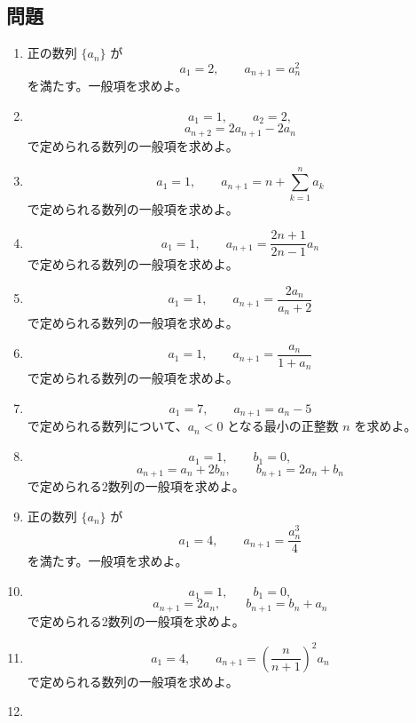     \subsection{問題}\label{節：基本と応用から出題されるもの：問題}
      \begin{enumerate}[label=\textbf{問\arabic*.},leftmargin=3.8em,format=\bookitemlink{practice-basic}{problem}{answer}]
        \item 正の数列 \(\{a_n\}\) が
          \[
            a_1=2,\qquad a_{n+1}=a_n^2
          \]
              を満たす。一般項を求めよ。
        \item \[
            a_1=1,\qquad a_2=2,
          \]
          \[
            a_{n+2}=2a_{n+1}-2a_n
          \]
              で定められる数列の一般項を求めよ。
        \item \[
            a_1=1,\qquad
            a_{n+1}=n+\sum_{k=1}^{n}a_k
          \]
              で定められる数列の一般項を求めよ。
        \item \[
            a_1=1,\qquad
            a_{n+1}=\frac{2n+1}{2n-1}a_n
          \]
              で定められる数列の一般項を求めよ。
        \item \[
            a_1=1,\qquad
            a_{n+1}=\frac{2a_n}{a_n+2}
          \]
              で定められる数列の一般項を求めよ。
        \item \[
            a_1=1,\qquad
            a_{n+1}=\frac{a_n}{1+a_n}
          \]
              で定められる数列の一般項を求めよ。
        \item \[
            a_1=7,\qquad a_{n+1}=a_n-5
          \]
              で定められる数列について、\(a_n<0\) となる最小の正整数 \(n\) を求めよ。
        \item \[
            a_1=1,\qquad b_1=0,
          \]
          \[
            a_{n+1}=a_n+2b_n,\qquad
            b_{n+1}=2a_n+b_n
          \]
              で定められる2数列の一般項を求めよ。
        \item 正の数列 \(\{a_n\}\) が
          \[
            a_1=4,\qquad
            a_{n+1}=\frac{a_n^3}{4}
          \]
              を満たす。一般項を求めよ。
        \item \[
            a_1=1,\qquad b_1=0,
          \]
          \[
            a_{n+1}=2a_n,\qquad
            b_{n+1}=b_n+a_n
          \]
              で定められる2数列の一般項を求めよ。
        \item \[
            a_1=4,\qquad
            a_{n+1}=\left(\frac{n}{n+1}\right)^2a_n
          \]
              で定められる数列の一般項を求めよ。
        \item \[
\]
\end{enumerate}
